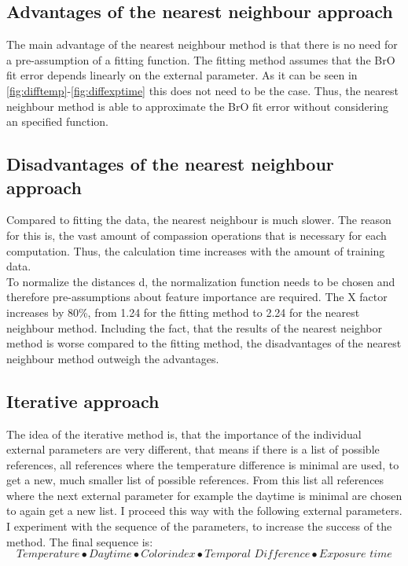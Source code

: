 \documentclass  [
  paper    = a4,
  BCOR     = 10mm,
  twoside,
  fontsize = 12pt,
  fleqn,
  toc      = bibnumbered,
  toc      = listofnumbered,
  numbers  = noendperiod,
  headings = normal,
  listof   = leveldown,
  version  = 3.03
]                                       {scrreprt}
\begin{document}
%

\subsection*{Advantages of the nearest neighbour approach}
	The main advantage of the nearest neighbour method is that there is no need for a pre-assumption of a fitting function. The fitting method assumes that the BrO fit error depends linearly  on the external parameter. As it can be seen in \cref{fig:difftemp}-\cref{fig:diffexptime} this does not need to be the case. Thus, the nearest neighbour method is able to approximate the BrO fit error without considering an specified function.
%
\subsection*{Disadvantages of the nearest neighbour approach}
	Compared to fitting the data, the nearest neighbour is much slower. The reason for this is, the vast amount of compassion operations that is necessary for each computation. Thus, the calculation time increases with the amount of training data.\\
	To normalize the distances d, the normalization function needs to be chosen and therefore pre-assumptions about feature importance are required.
	The X factor increases by 80\%, from 1.24 for the fitting method 
	to 2.24 for the nearest neighbour method.
	Including the fact, that the results of the nearest neighbor method is worse compared to the fitting method, the disadvantages of the nearest neighbour method outweigh the advantages.

	\subsection{Iterative approach}

	The idea of the iterative method is, that the importance of the individual external parameters are very different, that means if there is a list of possible references, all references where the temperature difference is minimal are used, to get a new, much smaller list of possible references. From this list all references where the next external parameter for example the daytime is minimal are chosen to again get a new list. I proceed this way with the following external parameters. I experiment with the sequence of the parameters, to increase the success of the method. The final sequence is:
	\begin{equation*}
	Temperature \bullet  Daytime  \bullet Colorindex \bullet Temporal\,\, Difference \bullet Exposure \,\, time
	\end{equation*} 
\end{document}
